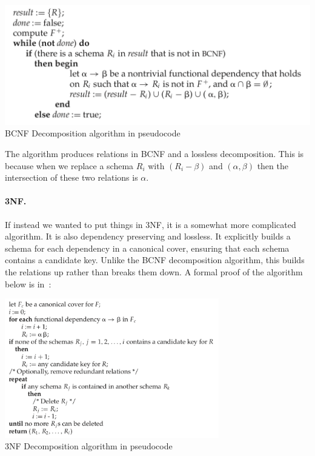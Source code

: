 \begin{center}
\includegraphics[width=0.7 \textwidth]{images/bcnf-algorithm}\\
BCNF Decomposition algorithm in pseudocode~\cite{dsc}
\end{center}

The algorithm produces relations in BCNF and a lossless decomposition. This is because when we replace a schema $R_{i}$ with $(R_{i} - \beta)$ and $(\alpha, \beta)$ then the intersection of these two relations is $\alpha$.

\paragraph{3NF.} If instead we wanted to put things in 3NF, it is a somewhat more complicated algorithm. It is also dependency preserving and lossless. It explicitly builds a schema for each dependency in a canonical cover, ensuring that each schema contains a candidate key. Unlike the BCNF decomposition algorithm, this builds the relations up rather than breaks them down. A formal proof of the algorithm below is in~\cite{dsc}: 

\begin{center}
\includegraphics[width=0.7\textwidth]{images/3nf-algorithm}\\
3NF Decomposition algorithm in pseudocode~\cite{dsc}
\end{center}




